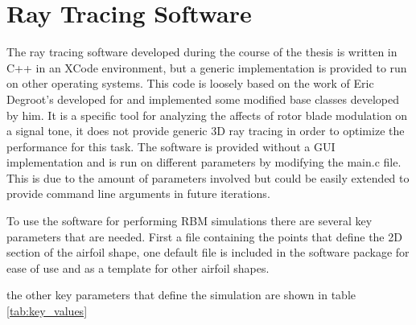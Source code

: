 \chapter{Ray Tracing Software}

The ray tracing software developed during the course of the thesis is written in C++ in an XCode environment, but a generic implementation is provided to run on other operating systems. This code is loosely based on the work of Eric Degroot's developed for \cite{Groot2015} and implemented some modified base classes developed by him. It is a specific tool for analyzing the affects of rotor blade modulation on a signal tone, it does not provide generic 3D ray tracing in order to optimize the performance for this task. The software is provided without a GUI implementation and is run on different parameters by modifying the main.c file. This is due to the amount of parameters involved but could be easily extended to provide command line arguments in future iterations.

To use the software for performing RBM simulations there are several key parameters that are needed. First a file containing the points that define the 2D section of the airfoil shape, one default file is included in the software package for ease of use and as a template for other airfoil shapes.

the other key parameters that define the simulation are shown in table \ref{tab:key_values}

